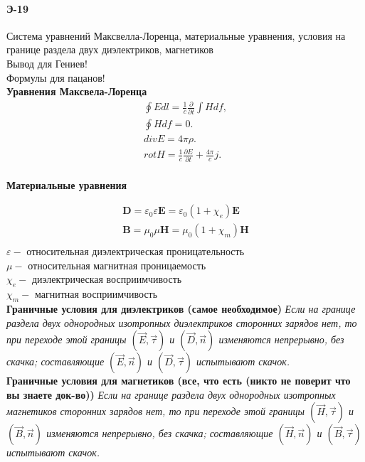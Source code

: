 \documentclass[__main__.tex]{subfiles}
\begin{document}
\paragraph{Э-19}
Система уравнений Максвелла-Лоренца, материальные уравнения, условия на границе раздела двух диэлектриков, магнетиков\\
Вывод для Гениев!\\
Формулы для пацанов!\\

\textbf{Уравнения Максвела-Лоренца}
\begin{gather*}
	\oint Edl = \frac{1}{c}\frac{\partial}{\partial t}\int Hdf,\\
	\oint H df = 0.\\
	div E = 4\pi\rho.\\
	rot H = \frac{1}{c}\frac{\partial E}{\partial t} + \frac{4\pi}{c}j.\\
\end{gather*}

 \textbf{Материальные уравнения}

\begin{gather*}
	\mathbf {D} =\varepsilon _{0}\varepsilon \mathbf {E} =\varepsilon _{0}(1+\chi _{e})\mathbf {E} \\
	\mathbf {B} =\mu _{0}\mu \mathbf {H} =\mu _{0}(1+\chi _{m})\mathbf {H} \\
\end{gather*}
$\varepsilon-$ относительная диэлектрическая проницательность\\
$\mu-$ относительная магнитная проницаемость\\
$\chi _{e}-$ диэлектрическая восприимчивость\\
$\chi _{m}-$ магнитная восприимчивость\\

 \textbf{Граничные условия для диэлектриков (самое необходимое)} \emph{Если на границе раздела двух однородных изотропных диэлектриков сторонних зарядов нет, то при переходе этой границы $(\vec{E},\vec{\tau})$ и $(\vec{D},\vec{n})$ изменяются непрерывно, без скачка; составляющие $(\vec{E},\vec{n})$ и $(\vec{D},\vec{\tau})$ испытывают скачок.}\\

 \textbf{Граничные условия для магнетиков (все, что есть (никто не поверит что вы знаете док-во))} \emph{Если на границе раздела двух однородных изотропных магнетиков сторонних зарядов нет, то при переходе этой границы $(\vec{H},\vec{\tau})$ и $(\vec{B},\vec{n})$ изменяются непрерывно, без скачка; составляющие $(\vec{H},\vec{n})$ и $(\vec{B},\vec{\tau})$ испытывают скачок.}\\
\end{document}
